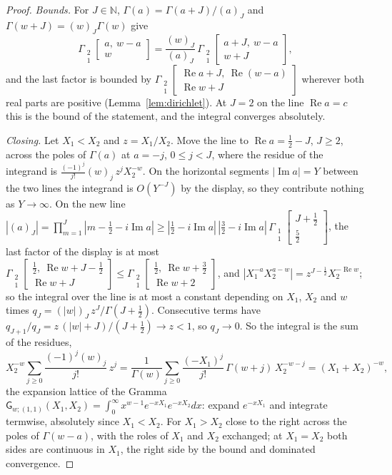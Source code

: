 \documentclass[11pt]{article}
\theoremstyle{plain}
\theoremstyle{definition}
\theoremstyle{remark}
\newcommand{\N}{\mathbb N}
\newcommand{\sG}{\mathsf G}
\newcommand{\Gst}[4]{\Gamma_{\substack{#1\\#2}}\!\begin{bmatrix}#3\\#4\end{bmatrix}}
\DeclareMathOperator{\re}{Re}
\DeclareMathOperator{\im}{Im}
\begin{document}
\begin{proof}
\emph{Bounds.} For $J\in\N$, $\Gamma(a)=\Gamma(a+J)/(a)_J$ and $\Gamma(w+J)=(w)_J\Gamma(w)$ give
\[
\Gst21{a,\ w-a}{w}=\frac{(w)_J}{(a)_J}\,\Gst21{a+J,\ w-a}{w+J},
\]
and the last factor is bounded by $\Gst21{\re a+J,\ \re(w-a)}{\re w+J}$ wherever both real parts are positive (Lemma~\ref{lem:dirichlet}). At $J=2$ on the line $\re a=c$ this is the bound of the statement, and the integral converges absolutely.

\emph{Closing.} Let $X_1<X_2$ and $z=X_1/X_2$. Move the line to $\re a=\frac12-J$, $J\ge2$, across the poles of $\Gamma(a)$ at $a=-j$, $0\le j<J$, where the residue of the integrand is $\frac{(-1)^j}{j!}(w)_j\,z^jX_2^{-w}$. On the horizontal segments $|\im a|=Y$ between the two lines the integrand is $O(Y^{-J})$ by the display, so they contribute nothing as $Y\to\infty$. On the new line $|(a)_J|=\prod_{m=1}^J|m-\frac12-i\im a|\ge|\frac12-i\im a|\,|\frac32-i\im a|\,\Gst11{J+\frac12}{\frac52}$, the last factor of the display is at most $\Gst21{\frac12,\ \re w+J-\frac12}{\re w+J}\le\Gst21{\frac12,\ \re w+\frac32}{\re w+2}$, and $|X_1^{-a}X_2^{a-w}|=z^{J-\frac12}X_2^{-\re w}$; so the integral over the line is at most a constant depending on $X_1$, $X_2$ and $w$ times $q_J=(|w|)_J\,z^J/\Gamma(J+\frac12)$. Consecutive terms have $q_{J+1}/q_J=z\,(|w|+J)/(J+\frac12)\to z<1$, so $q_J\to0$. So the integral is the sum of the residues,
\[
X_2^{-w}\sum_{j\ge0}\frac{(-1)^j(w)_j}{j!}\,z^j=\frac{1}{\Gamma(w)}\sum_{j\ge0}\frac{(-X_1)^j}{j!}\,\Gamma(w+j)\,X_2^{-w-j}=(X_1+X_2)^{-w},
\]
the expansion lattice of the Gramma $\sG_{w;(1,1)}(X_1,X_2)=\int_0^\infty x^{w-1}e^{-xX_1}e^{-xX_2}dx$: expand $e^{-xX_1}$ and integrate termwise, absolutely since $X_1<X_2$. For $X_1>X_2$ close to the right across the poles of $\Gamma(w-a)$, with the roles of $X_1$ and $X_2$ exchanged; at $X_1=X_2$ both sides are continuous in $X_1$, the right side by the bound and dominated convergence.
\end{proof}
\end{document}
